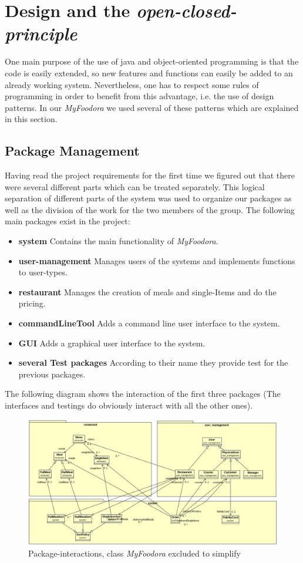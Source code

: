 \section{Design and the \textit{open-closed-principle}}
One main purpose of the use of java and object-oriented programming is that the code is easily
extended, so new features and functions can easily be added to an already working system.
Nevertheless, one has to respect some rules of programming in order to benefit from this
advantage, i.e. the use of design patterns.
In our \textit{MyFoodora} we used several of these patterns which are explained in this section.

\subsection{Package Management}
\label{sub:package_management}

Having read the project requirements for the first time we figured out that there were several
different parts which can be treated separately. This logical separation of different parts of the
system was used to organize our packages as well as the division of the work for the two members
of the group. The following main packages exist in the project:
\begin{itemize}
	\item{\textbf{system}} Contains the main functionality of \textit{MyFoodora}.
	\item{\textbf{user-management}} Manages users of the systems and implements functions
		to user-types.
	\item{\textbf{restaurant}} Manages the creation of meals and single-Items and do the
		pricing.
	\item{\textbf{commandLineTool}} Adds a command line user interface to the system.
	\item{\textbf{GUI}} Adds a graphical user interface to the system.
	\item{\textbf{several Test packages}} According to their name they provide test for the
		previous packages.
\end{itemize}

The following diagram shows the interaction of the first three packages (The interfaces and
testings do obviously interact with all the other ones).

\begin{figure}[H]
	\centering
	\includegraphics[width=1\linewidth]{./ima/packages.jpg}
	\caption{Package-interactions, class \textit{MyFoodora} excluded to simplify}
	\label{fig:packages}
\end{figure}

